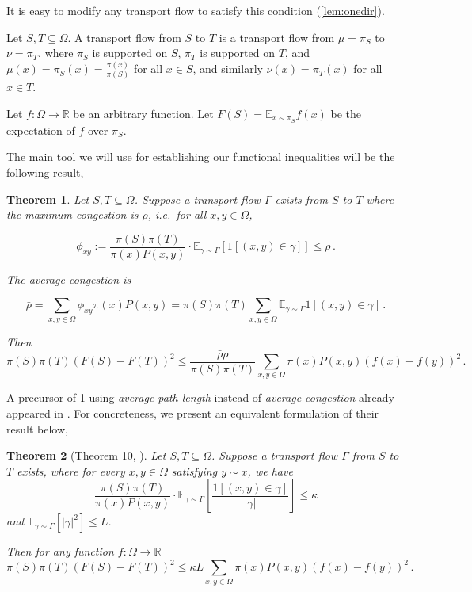\documentclass[a4paper, 12p]{article}
\numberwithin{equation}{section}
\newcommand{\Exp}{\mathbb{E}}
\newcommand{\FF}{F}
\newtheorem{theorem}{Theorem}[section]
\begin{document}
It is easy to modify any transport flow to satisfy this condition (\cref{lem:onedir}).


Let $S, T \subseteq \Omega$. A transport flow from $S$ to $T$ is a transport flow from $\mu = \pi_S$ to $\nu = \pi_T$, where $\pi_S$ is supported on $S$, $\pi_T$ is supported on $T$, and $\mu(x) = \pi_S(x) = \frac{\pi(x)}{\pi(S)}$ for all $x \in S$, and similarly $\nu(x) = \pi_T(x)$ for all $x \in T$.

Let $f: \Omega \rightarrow \mathbb{R}$ be an arbitrary function. Let $\FF(S) = \Exp_{x \sim \pi_S} f(x)$ be the expectation of $f$ over $\pi_S$. 

The main tool we will use for establishing our functional inequalities will be the following result,
\begin{theorem}\label{thm:ourtransport}
Let $S, T \subseteq \Omega$. Suppose a transport flow $\Gamma$ exists from $S$ to $T$ where the maximum congestion is $\rho$, i.e.~for all $x,y \in \Omega$, 

\[
   \phi_{xy} := \frac{\pi(S)\pi(T)}{\pi(x)P(x, y)} \cdot \Exp_{\gamma \sim \Gamma} \left[ 1[(x, y) \in \gamma]\right] \leq \rho\,.
\]

The {average congestion} is

\[
    \bar\rho =  \sum_{x,y\in\Omega} \phi_{xy}\pi(x)P(x, y) = \pi(S)\pi(T)\sum_{x, y \in \Omega} \Exp_{\gamma \sim \Gamma}  1[(x, y) \in \gamma]\,.
\]


Then 
\begin{equation}
    \pi(S)\pi(T)(\FF(S) - \FF(T))^2 \leq \frac{\bar\rho\rho}{\pi(S)\pi(T)}\sum_{x, y \in \Omega}\pi(x)P(x, y)(f(x) - f(y))^2\,.
    \label{eqn:transport}
\end{equation}

\end{theorem}
A precursor of \cref{thm:ourtransport} using \emph{average path length} instead of \emph{average congestion} already appeared in \cite{weimingjs}. For concreteness, we present an equivalent formulation of their result below, 
\begin{theorem}[Theorem 10, \cite{weimingjs}]
\label{thm:transport}
    Let $S, T \subseteq \Omega$. Suppose a transport flow $\Gamma$ from $S$ to $T$ exists, where for every $x, y \in \Omega$ satisfying $y \sim x$, we have
    \[
        \frac{\pi(S)\pi(T)}{\pi(x)P(x, y)} \cdot \Exp_{\gamma \sim \Gamma}\left[\frac{1[(x, y) \in \gamma]}{|\gamma|}\right] \leq \kappa
    \]
    and $\Exp_{\gamma \sim \Gamma}\left[|\gamma|^2\right] \leq L$. 
    
    Then for any function $f: \Omega \rightarrow \mathbb{R}$
    \[
        \pi(S)\pi(T)(\FF(S) - \FF(T))^2 \leq \kappa L \sum_{x, y \in \Omega} \pi(x)P(x, y)(f(x) - f(y))^2\,.
    \]
\end{theorem}
\end{document}
